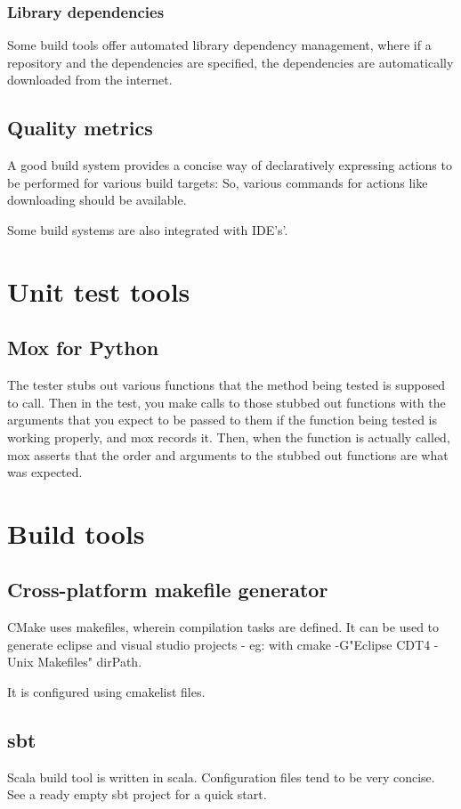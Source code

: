 \documentclass[oneside, article]{memoir}
\begin{document}
\subsection{Library dependencies}
Some build tools offer automated library dependency management, where if a repository and the dependencies are specified, the dependencies are automatically downloaded from the internet.

\section{Quality metrics}
A good build system provides a concise way of declaratively expressing actions to be performed for various build targets: So, various commands for actions like downloading should be available.

Some build systems are also integrated with IDE's'.

\chapter{Unit test tools}
\section{Mox for Python}
The tester stubs out various functions that the method being tested is supposed to call. Then in the test, you make calls to those stubbed out functions with the arguments that you expect to be passed to them if the function being tested is working properly, and mox records it. Then, when the function is actually called, mox asserts that the order and arguments to the stubbed out functions are what was expected.



\chapter{Build tools}
\section{Cross-platform makefile generator}
CMake uses makefiles, wherein compilation tasks are defined. It can be used to generate eclipse and visual studio projects - eg: with cmake -G"Eclipse CDT4 - Unix Makefiles" dirPath.

It is configured using cmakelist files.

\section{sbt}
Scala build tool is written in scala. Configuration files tend to be very concise. See a ready empty sbt project for a quick start.
\end{document}
